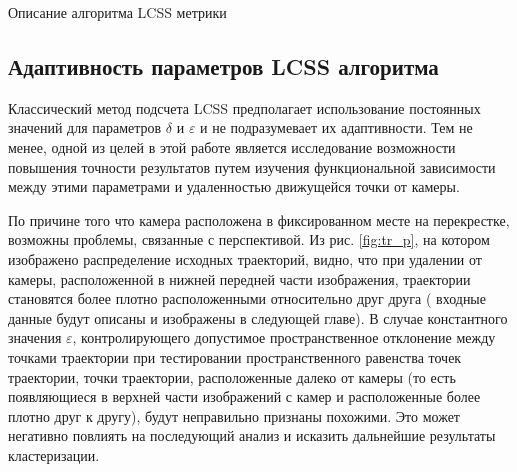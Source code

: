 \begin{algorithm}[!htb]
	\caption{Описание алгоритма LCSS метрики}
	\label{algo:lcss-descr}
	\SetAlgoLined
\end{algorithm}

\subsection{Адаптивность параметров LCSS алгоритма}

Классический метод подсчета LCSS предполагает использование постоянных значений для параметров $\delta$ и $\varepsilon$ и не подразумевает их адаптивности. Тем не менее, одной из целей в этой работе является исследование возможности повышения точности результатов путем изучения функциональной зависимости между этими параметрами и удаленностью движущейся точки от камеры.

По причине того что камера расположена в фиксированном месте на перекрестке, возможны проблемы, связанные с перспективой. Из рис. \ref{fig:tr_p}, на котором изображено распределение исходных траекторий, видно, что при удалении от камеры, расположенной в нижней передней части изображения, траектории становятся более плотно расположенными относительно друг друга ( входные данные будут описаны и изображены в следующей главе). В случае константного значения $\varepsilon$, контролирующего допустимое пространственное отклонение между точками траектории при тестировании пространственного равенства точек траектории, точки траектории, расположенные далеко от камеры (то есть появляющиеся в верхней части изображений с камер и расположенные более плотно друг к другу), будут неправильно признаны похожими. Это может негативно повлиять на последующий анализ и исказить дальнейшие результаты кластеризации.

